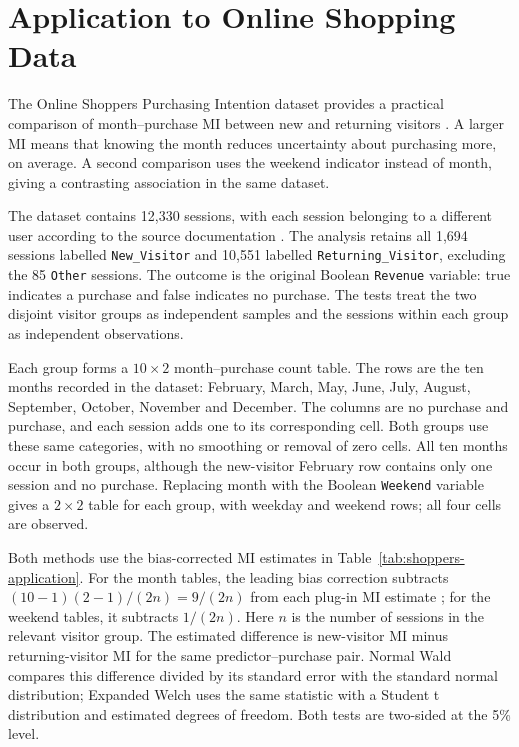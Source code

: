 \section{Application to Online Shopping Data}
\label{sec:shoppers-application}

The Online Shoppers Purchasing Intention dataset provides a practical
comparison of month--purchase MI between new and returning visitors
\citep{sakar2018}.
A larger MI means that knowing the month reduces uncertainty about
purchasing more, on average. A second comparison uses the weekend indicator instead
of month, giving a contrasting association in the same dataset.

The dataset contains 12,330 sessions, with each session belonging to a
different user according to the source documentation \citep{sakar2018}.
The analysis retains all 1,694 sessions labelled \texttt{New\_Visitor}
and 10,551 labelled \texttt{Returning\_Visitor}, excluding the 85
\texttt{Other} sessions. The outcome is the original Boolean
\texttt{Revenue} variable: true indicates a purchase and false indicates
no purchase. The tests treat the two disjoint visitor groups as independent
samples and the sessions within each group as independent observations.

Each group forms a \(10\times2\) month--purchase count table. The rows
are the ten months recorded in the dataset: February, March, May, June,
July, August, September, October, November and December. The columns
are no purchase and purchase, and each session adds one to its corresponding
cell. Both groups use these same categories, with no smoothing or removal
of zero cells. All ten months occur in both groups, although the new-visitor
February row contains only one session and no purchase. Replacing month
with the Boolean \texttt{Weekend} variable gives a \(2\times2\) table
for each group, with weekday and weekend rows; all four cells are observed.

Both methods use the bias-corrected MI estimates in
Table~\ref{tab:shoppers-application}. For the month tables, the leading
bias correction subtracts \((10-1)(2-1)/(2n)=9/(2n)\) from each plug-in
MI estimate \citep{moddemeijer1989};
for the weekend tables, it subtracts \(1/(2n)\). Here \(n\) is the
number of sessions in the relevant visitor group. The estimated
difference is new-visitor MI minus returning-visitor MI for the same
predictor--purchase pair. Normal Wald
compares this difference divided by its standard error with the standard
normal distribution; Expanded Welch uses the same statistic with a
Student t distribution and estimated degrees of freedom. Both tests
are two-sided at the 5\% level.

